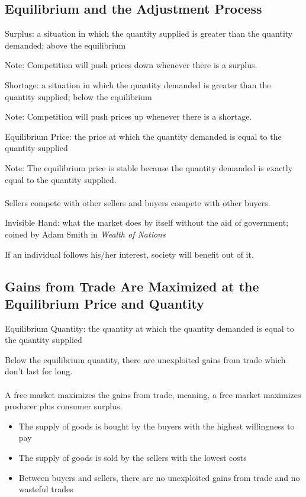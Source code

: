 \documentclass[12pt]{article}
\begin{document}
\subsection{Equilibrium and the Adjustment Process}
\begin{definition} Surplus: a situation in which the quantity supplied is greater than the quantity demanded; above the equilibrium \end{definition}
Note: Competition will push prices down whenever there is a surplus. 
\begin{definition} Shortage: a situation in which the quantity demanded is greater than the quantity supplied; below the equilibrium \end{definition}
Note: Competition will push prices up whenever there is a shortage. 
\begin{definition} Equilibrium Price: the price at which the quantity demanded is equal to the quantity supplied \end{definition}
Note: The equilibrium price is stable because the quantity demanded is exactly equal to the quantity supplied. \\~\\
Sellers compete with other sellers and buyers compete with other buyers.
\begin{definition} Invisible Hand: what the market does by itself without the aid of government; coined by Adam Smith in \textit{Wealth of Nations} \end{definition} If an individual follows his/her interest, society will benefit out of it. 

\subsection{Gains from Trade Are Maximized at the Equilibrium Price and Quantity} 
\begin{definition} Equilibrium Quantity: the quantity at which the quantity demanded is equal to the quantity supplied \end{definition}
Below the equilibrium quantity, there are unexploited gains from trade which don't last for long. \\~\\
A free market maximizes the gains from trade, meaning, a free market maximizes producer plus consumer surplus. \begin{itemize} 
\item The supply of goods is bought by the buyers with the highest willingness to pay
\item The supply of goods is sold by the sellers with the lowest costs 
\item Between buyers and sellers, there are no unexploited gains from trade and no wasteful trades \end{itemize}
\end{document}
